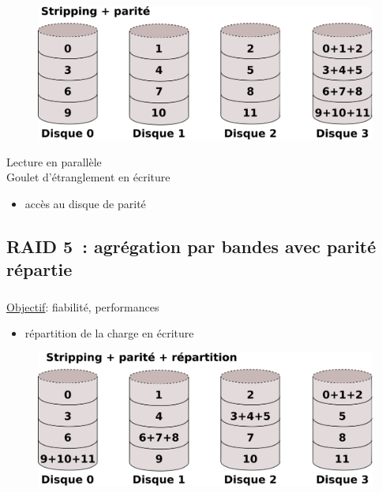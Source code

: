 \begin{frame}
\frametitle{\large{\insertsubsection}}
  \begin{figure}
    \includegraphics[width=1\linewidth]{fig3/RAID4}
  \end{figure}
  Lecture en parallèle\\
  \alert{Goulet d'étranglement en écriture}
  \begin{itemize}
  \item accès au disque de parité
  \end{itemize}
\end{frame}

\subsection[RAID 5]{RAID 5~: agrégation par bandes avec parité répartie}
\begin{frame}
\frametitle{\insertsubsection}
\underline{Objectif}: fiabilité, performances
\begin{itemize}
\item répartition de la charge en écriture
\end{itemize}
\begin{figure}
  \includegraphics[width=1\linewidth]{fig3/RAID5}
\end{figure}
\end{frame}

